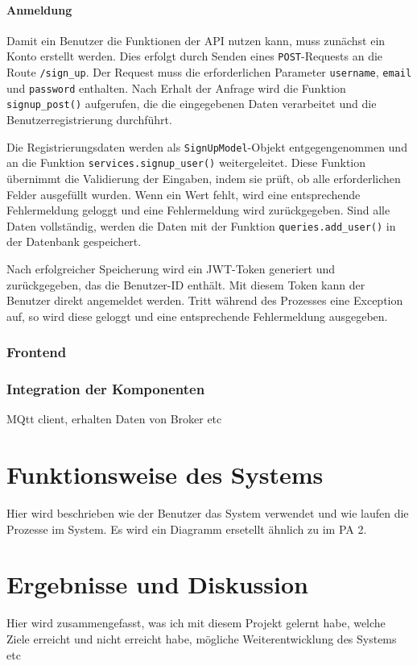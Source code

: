 \documentclass[12pt, letterpaper]{article}
\begin{document}
  \paragraph{Anmeldung}
  \par \textbf{}
  \par Damit ein Benutzer die Funktionen der API nutzen kann, muss zunächst ein Konto erstellt werden. Dies erfolgt durch Senden eines \texttt{POST}-Requests an die Route \texttt{/sign\_up}. Der Request muss die erforderlichen Parameter \texttt{username}, \texttt{email} und \texttt{password} enthalten. Nach Erhalt der Anfrage wird die Funktion \texttt{signup\_post()} aufgerufen, die die eingegebenen Daten verarbeitet und die Benutzerregistrierung durchführt.
  \par Die Registrierungsdaten werden als \texttt{SignUpModel}-Objekt entgegengenommen und an die Funktion \texttt{services.signup\_user()} weitergeleitet. Diese Funktion übernimmt die Validierung der Eingaben, indem sie prüft, ob alle erforderlichen Felder ausgefüllt wurden. Wenn ein Wert fehlt, wird eine entsprechende Fehlermeldung geloggt und eine Fehlermeldung wird zurückgegeben. Sind alle Daten vollständig, werden die Daten mit der Funktion \texttt{queries.add\_user()} in der Datenbank gespeichert. 
  \par Nach erfolgreicher Speicherung wird ein JWT-Token generiert und zurückgegeben, das die Benutzer-ID enthält. Mit diesem Token kann der Benutzer direkt angemeldet werden. Tritt während des Prozesses eine Exception auf, so wird diese geloggt und eine entsprechende Fehlermeldung ausgegeben.

  \subsubsection{Frontend}
  \subsubsection{Integration der Komponenten}
  \par MQtt client, erhalten Daten von Broker etc

\newpage
\section{Funktionsweise des Systems}
\par Hier wird beschrieben wie der Benutzer das System verwendet und wie laufen die Prozesse im System. Es wird ein Diagramm ersetellt ähnlich zu im PA 2. 
\section{Ergebnisse und Diskussion}
\par Hier wird zusammengefasst, was ich mit diesem Projekt gelernt habe, welche Ziele erreicht und nicht erreicht habe, mögliche Weiterentwicklung des Systems etc
\newpage
\end{document}
